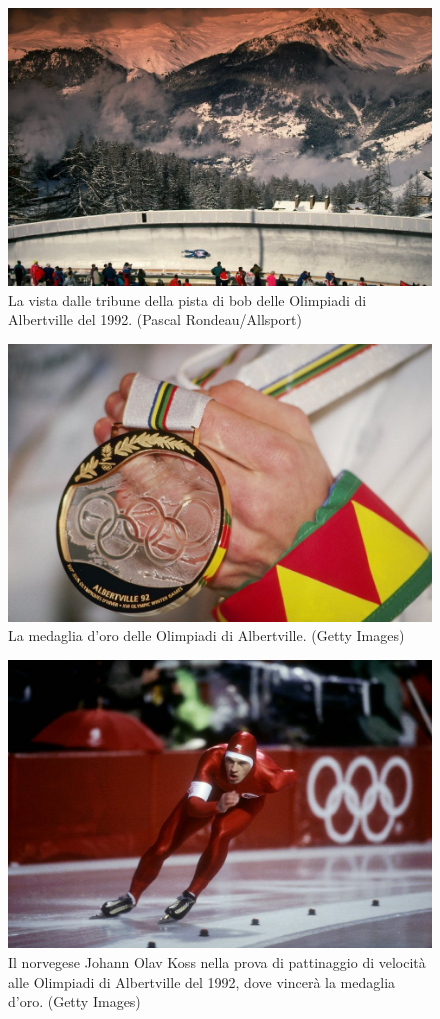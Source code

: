 \documentclass[
]{book}
\begin{document}
\begin{figure}
\includegraphics[width=0.8\linewidth]{images/IlPost/1992} \caption{La vista dalle tribune della pista di bob delle Olimpiadi di Albertville del 1992. (Pascal Rondeau/Allsport)}\label{fig:unnamed-chunk-53}
\end{figure}

\begin{figure}
\includegraphics[width=0.8\linewidth]{images/IlPost/1992(2)} \caption{La medaglia d'oro delle Olimpiadi di Albertville. (Getty Images)}\label{fig:unnamed-chunk-54}
\end{figure}

\begin{figure}
\includegraphics[width=0.8\linewidth]{images/IlPost/1992(3)} \caption{Il norvegese Johann Olav Koss nella prova di pattinaggio di velocità alle Olimpiadi di Albertville del 1992, dove vincerà la medaglia d'oro. (Getty Images)}\label{fig:unnamed-chunk-55}
\end{figure}
\end{document}
